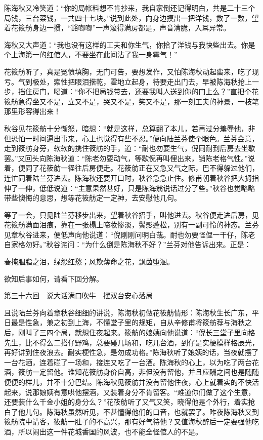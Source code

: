 \documentclass[12pt,UTF8]{ctexbook}
\begin{document}
{{{陈海秋又冷笑道：“你的局帐料想不肯抄来，我自家倒还记得明白，共是二十三个局钱，三台菜钱，一共四十七块。”说到此处，向身边摸出一把洋钱，数了一数，望着花筱舫身边一掼，“豁啷啷”一声滚得满房都是，声音清脆，入耳异常。

海秋又大声道：“我也没有这样的工夫和你生气，你拾了洋钱与我快些出去。你是个上海第一的红倌人，不要坐在此间沾了我一身霉气！”

花筱舫听了，真是冤愤填胸，无门可告，要想发作，又怕陈海秋动起蛮来，吃了现亏。气到极处，索性把眼泪揩乾，霍地立起身，待要走出门去，早被陈海秋抢上一步，挡住房门，喝道：“你不把局钱带去，还要我叫人送到你的门上么？”直把个花筱舫急得坐又不是，立又不是，哭又不是，笑又不是，那一刻工夫的神景，一枝笔那里形容得出来！

秋谷见花筱舫十分惭怒，暗想：“就是这样，总算翻了本儿，若再过分羞辱他，非但恐怕一时间逼出事来，心上也觉得有些不忍。”便向陆兰芬使个眼色。兰芬会意，走到筱舫身旁，软软的携住筱舫的手，道：“耐也勿要生气，倪同耐到后房去坐歇罢。”又回头向陈海秋道：“陈老勿要动气，等歇倪再叫俚出来，销陈老格气性。”说着，便同了花筱舫一径往后房便走。花筱舫正在又急又气之际，巴不得躲过他们，连忙同着陆兰芬进去。陈海秋还要开口时，秋谷急急止住。修甫朝着秋谷把大拇指伸了一伸，低低说道：“主意果然甚好，只是陈海翁说话过分了些。”秋谷也觉略略带些懊悔的意思，想等花筱舫定一定神，去安慰他几句。

等了一会，只见陆兰芬移步出来，望着秋谷招手，叫他进去。秋谷便走进后房，见花筱舫满面泪痕，靠在一张榻上啼妆惨淡，鬓影蓬松，别有一副可怜的神态。兰芬见章秋谷进来，便低声向他说道：“倪刚刚问明白哉。耐也勿要怪俚一干仔，陈老自家格勿好。”秋谷诧问：“为什么倒是陈海秋不好？”兰芬对他告诉出来。正是：

春掩胭脂之泪，绿怨红愁；风欺薄命之花，飘茵堕溷。

欲知后事如何，请看下回分解。





第三十六回　说大话满口吹牛　摆双台安心落局





且说陆兰芬向着章秋谷细细的讲说，陈海秋初做花筱舫情形：陈海秋生长广东，平日最是性急，兼之初到上海，不懂堂子里的规矩，自从辛修甫将筱舫荐与海秋之后，刚叫了三四个局，就想住夜起来。筱舫的娘姨向他说道：“倪长三堂子里向格先生，比不得么二搭仔野鸡，总要碰几场和，吃几台酒，到仔是实梗模样格辰光，再好讲到住夜浪去。耐实梗性急，是勿成功格。”陈海秋听了娘姨的话，当夜就摆了一台花酒，连着碰了一场和，接连又吃了一台酒。陈海秋的心上，以为吃了两台花酒，筱舫一定留他。谁知花筱舫身价自高，非但没有留他，并且应酬之间也是随随便便的样儿，并不十分巴结。陈海秋见筱舫并没有留他住夜，心上就着实的不快活起来，说那娘姨有意哄他摆酒，又装着身分不肯留客。“难道你们做了这个生意，还要装什么千金小姐的身分么？”花筱舫听了又气又笑，晓得他是个外行，着实抢白了他儿句。陈海秋虽然听见，不甚懂得他们的口音，也就罢了。昨夜陈海秋又到筱舫院中请客，筱舫一肚子的不高兴，那有好气待他？又值海秋醉后一定要强他吃酒，所以闹出这一件花城香国的风波，也不能全怪倌人的不是。

}}}
\end{document}
